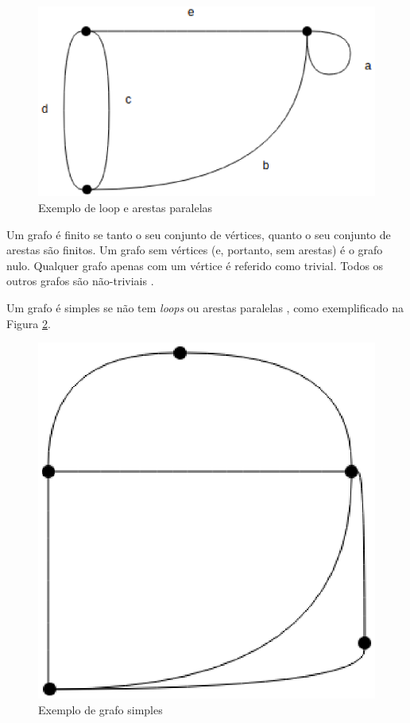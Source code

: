 \begin{figure}[!h]
	\centering
	\includegraphics[scale=0.5]{figuras/capitulo1/loop_paralela.eps}
	\caption{Exemplo de loop e arestas paralelas}
	\label{loop_paralela}
\end{figure}

Um grafo é finito se tanto o seu conjunto de vértices, quanto o seu conjunto de arestas são finitos. Um grafo sem vértices (e, portanto, sem arestas) é o grafo nulo. Qualquer grafo apenas com um vértice é referido como trivial. Todos os outros grafos são não-triviais \cite{Costa:2011}.

Um grafo é simples se não tem \textit{loops} ou arestas paralelas \cite{Diestel:1997}, como exemplificado na Figura \ref{grafo_simples}.

\begin{figure}[!h]
	\centering
	\includegraphics[scale=0.5]{figuras/capitulo1/grafo_simples.eps}
	\caption{Exemplo de grafo simples}
	\label{grafo_simples}
\end{figure}

